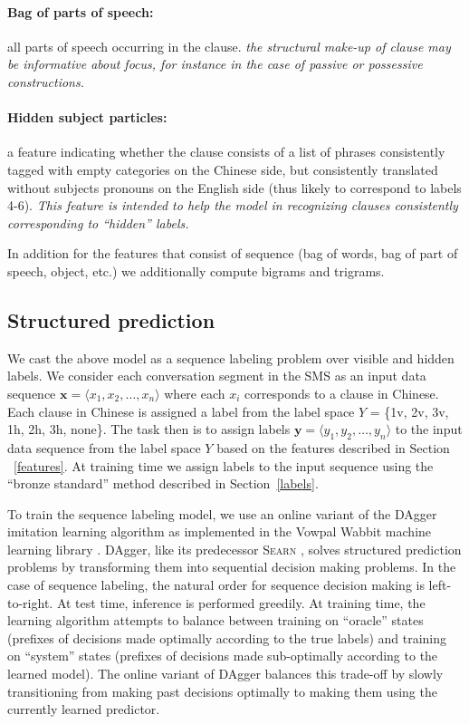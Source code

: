 \documentclass[11pt]{report}
\renewcommand\cite{\citep}	%
\renewcommand{\vec}[1]{\boldsymbol{#1}}
\begin{document}
\paragraph{Bag of parts of speech:} all parts of speech occurring in the clause.   \emph{the structural make-up of clause may be informative about focus, for instance in the case of passive or possessive constructions.}
\vspace{-0.5em}

\paragraph{Hidden subject particles:} a feature indicating whether the clause consists of a list of phrases consistently tagged with empty categories on the Chinese side, but consistently translated without subjects pronouns on the English side (thus likely to correspond to labels 4-6).   \emph{This feature is intended to help the model in recognizing clauses consistently corresponding to ``hidden'' labels.}

In addition for the features that consist of sequence (bag of words, bag of part of speech, object, etc.) we additionally compute bigrams and trigrams.

\subsection{Structured prediction}

We cast the above model as a sequence labeling problem over visible and hidden labels. We consider each conversation segment in the SMS as an input data sequence $\vec x = \langle x_1, x_2, \dots, x_n\rangle$ where each $x_i$ corresponds to a clause in Chinese. Each clause in Chinese is assigned a label from the label space $Y$ = \{1v, 2v, 3v, 1h, 2h, 3h, none\}. The task then is to assign labels $\vec y = \langle y_1, y_2, \dots, y_n\rangle$ to the input data sequence from the label space $Y$ based on the features described in Section ~\ref{features}. At training time we assign labels to the input sequence using the ``bronze standard'' method described in Section~\ref{labels}.

To train the sequence labeling model, we use an online variant of the DAgger imitation learning algorithm \cite{ross11dagger} as implemented in the Vowpal Wabbit machine learning library \cite{langford2007vowpal,daume2014efficient}. DAgger, like its predecessor \textsc{Searn} \cite{daume2009search}, solves structured prediction problems by transforming them into sequential decision making problems. In the case of sequence labeling, the natural order for sequence decision making is left-to-right. At test time, inference is performed greedily. At training time, the learning algorithm attempts to balance between training on ``oracle'' states (prefixes of decisions made optimally according to the true labels) and training on ``system'' states (prefixes of decisions made sub-optimally according to the learned model). The online variant of DAgger balances this trade-off by slowly transitioning from making past decisions optimally to making them using the currently learned predictor.
\end{document}
